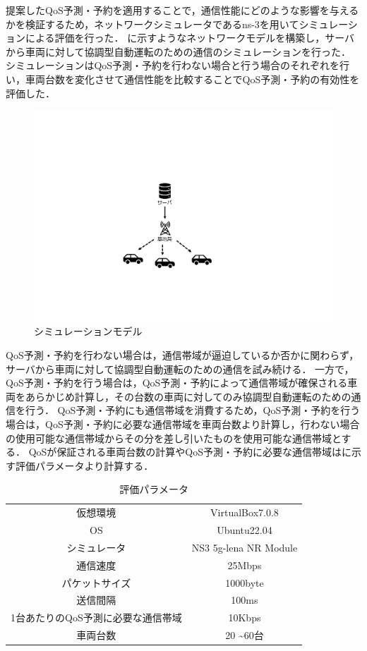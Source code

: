 \documentclass[a4paper,11pt,uplatex]{ujreport}
\begin{document}
  提案したQoS予測・予約を適用することで，通信性能にどのような影響を与えるかを検証するため，ネットワークシミュレータであるns-3\cite{ns-3}を用いてシミュレーションによる評価を行った．
  に示すようなネットワークモデルを構築し，サーバから車両に対して協調型自動運転のための通信のシミュレーションを行った．
  シミュレーションはQoS予測・予約を行わない場合と行う場合のそれぞれを行い，車両台数を変化させて通信性能を比較することでQoS予測・予約の有効性を評価した．\par

  \begin{figure}[tb]
    \centering
    \includegraphics[width=0.60\linewidth]{img/シミュレーションモデル2.pdf}
    \caption{シミュレーションモデル}
    \label{fig:model}
  \end{figure}

  QoS予測・予約を行わない場合は，通信帯域が逼迫しているか否かに関わらず，サーバから車両に対して協調型自動運転のための通信を試み続ける．
  一方で，QoS予測・予約を行う場合は，QoS予測・予約によって通信帯域が確保される車両をあらかじめ計算し，その台数の車両に対してのみ協調型自動運転のための通信を行う．
  QoS予測・予約にも通信帯域を消費するため，QoS予測・予約を行う場合は，QoS予測・予約に必要な通信帯域を車両台数より計算し，行わない場合の使用可能な通信帯域からその分を差し引いたものを使用可能な通信帯域とする．
  QoSが保証される車両台数の計算やQoS予測・予約に必要な通信帯域はに示す評価パラメータより計算する．\par
  
  \begin{table}[tb]
    \centering
    \caption{評価パラメータ}
    \label{tab:parameter}
    \begin{tabular}{cc}
      \hline
      仮想環境 & VirtualBox7.0.8\\
      OS & Ubuntu22.04\\
      シミュレータ & NS3 5g-lena NR Module\\
      通信速度 & 25Mbps\\
      パケットサイズ & 1000byte\\
      送信間隔 & 100ms\\
      1台あたりのQoS予測に必要な通信帯域 & 10Kbps\\
      車両台数 & 20 \textasciitilde 60台\\
      \hline
    \end{tabular}
  \end{table}
\end{document}

